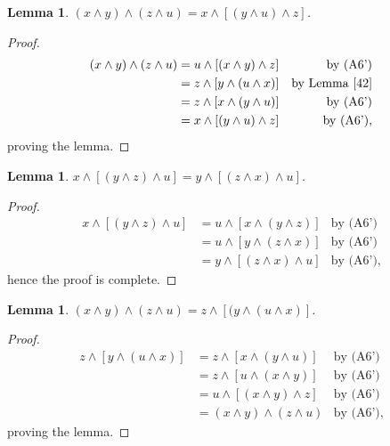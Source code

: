 \documentclass{amsart}
\theoremstyle{plain}
\newtheorem{lemma}[theorem]{Lemma}
\theoremstyle{problem}
\theoremstyle{definition}
\theoremstyle{remark}
\numberwithin{equation}{section}
\begin{document}
\begin{lemma}\label{43}
    $(x \land y) \land (z \land u) = x \land [(y \land u) \land z]$.
\end{lemma}
\begin{proof}
\begin{align*}
    (x \land y) \land (z \land u) 
             &= u \land [(x \land y) \land z] &\text{by (A6')}\\
             &= z \land [y \land (u \land x)] &\text{by Lemma \ref{42}}\\ 
             &= z \land [x \land (y \land u)] &\text{by (A6')}\\
             &= x \land [(y \land u) \land z] &\text{by (A6')},
\end{align*}
proving the lemma.
\end{proof}

\begin{lemma}\label{44}
    $x \land [(y \land z) \land u] = y \land [(z \land x) \land u]$.
\end{lemma}

\begin{proof}
\begin{align*}
   x \land [(y \land z) \land u] 
                  &= u \land [x \land (y \land z)] &\text{by (A6')}\\
                  &= u \land [y \land (z \land x)] &\text{by (A6')}\\
                  &= y \land [(z \land x) \land u] &\text{by (A6')},
\end{align*}
hence the proof is complete.
\end{proof}

\begin{lemma} \label{45}
    $(x \land y) \land (z \land u) = z \land [(y \land (u \land x)]$.
\end{lemma}

\begin{proof}
\begin{align*}
    z \land [y \land (u \land x)]
            &= z \land [x \land (y \land u)] &\text{by (A6')}\\
            &= z \land [u \land (x \land y)] &\text{by (A6')}\\
            &= u \land [(x \land y) \land z] &\text{by (A6')}\\
            &= (x \land y) \land (z \land u) &\text{by (A6')},
 \end{align*}
proving the lemma.
\end{proof}
\end{document}
